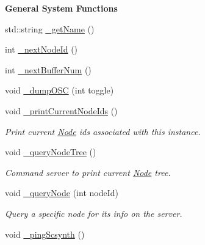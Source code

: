 \begin{Indent}{\bf General System Functions}\par
\begin{DoxyCompactItemize}
\item 
std\-::string \hyperlink{classColliderPlusPlus_1_1Client__Server_af9261516f282efbab896bff53ee52095}{\-\_\-get\-Name} ()
\item 
int \hyperlink{classColliderPlusPlus_1_1Client__Server_a4c45d5eb7b6bef9dd50c6376f3752d3e}{\-\_\-next\-Node\-Id} ()
\item 
int \hyperlink{classColliderPlusPlus_1_1Client__Server_af8224413e4b5bb059ba8b6165459dd7d}{\-\_\-next\-Buffer\-Num} ()
\item 
void \hyperlink{classColliderPlusPlus_1_1Client__Server_ae0fb9a18089043723fff0b11b57446ad}{\-\_\-dump\-O\-S\-C} (int toggle)
\item 
\hypertarget{classColliderPlusPlus_1_1Client__Server_a7d4511e809e49a26725750a8d3d859aa}{void \hyperlink{classColliderPlusPlus_1_1Client__Server_a7d4511e809e49a26725750a8d3d859aa}{\-\_\-print\-Current\-Node\-Ids} ()}\label{classColliderPlusPlus_1_1Client__Server_a7d4511e809e49a26725750a8d3d859aa}

\begin{DoxyCompactList}\small\item\em Print current \hyperlink{classColliderPlusPlus_1_1Node}{Node} ids associated with this instance. \end{DoxyCompactList}\item 
\hypertarget{classColliderPlusPlus_1_1Client__Server_a89364c9a2410454377434ee3eb2446ed}{void \hyperlink{classColliderPlusPlus_1_1Client__Server_a89364c9a2410454377434ee3eb2446ed}{\-\_\-query\-Node\-Tree} ()}\label{classColliderPlusPlus_1_1Client__Server_a89364c9a2410454377434ee3eb2446ed}

\begin{DoxyCompactList}\small\item\em Command server to print current \hyperlink{classColliderPlusPlus_1_1Node}{Node} tree. \end{DoxyCompactList}\item 
\hypertarget{classColliderPlusPlus_1_1Client__Server_a990e5c77c2579445279baa2f2850bf62}{void \hyperlink{classColliderPlusPlus_1_1Client__Server_a990e5c77c2579445279baa2f2850bf62}{\-\_\-query\-Node} (int node\-Id)}\label{classColliderPlusPlus_1_1Client__Server_a990e5c77c2579445279baa2f2850bf62}

\begin{DoxyCompactList}\small\item\em Query a specific node for its info on the server. \end{DoxyCompactList}\item 
\hypertarget{classColliderPlusPlus_1_1Client__Server_a1fcd07a4320a82fe6072d84689d9b8c6}{void \hyperlink{classColliderPlusPlus_1_1Client__Server_a1fcd07a4320a82fe6072d84689d9b8c6}{\-\_\-ping\-Scsynth} ()}\label{classColliderPlusPlus_1_1Client__Server_a1fcd07a4320a82fe6072d84689d9b8c6}


\end{DoxyCompactItemize}
\end{Indent}
